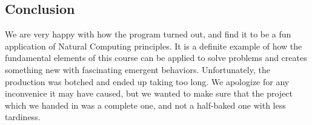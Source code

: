 \subsection{Conclusion}

We are very happy with how the program turned out, and find it to be a fun application of Natural Computing principles.  It is a definite example of how the fundamental elements of this course can be applied to solve problems and creates something new with fascinating emergent behaviors.  Unfortunately, the production was botched and ended up taking too long.  We apologize for any inconvenice it may have caused, but we wanted to make sure that the project which we handed in was a complete one, and not a half-baked one with less tardiness.